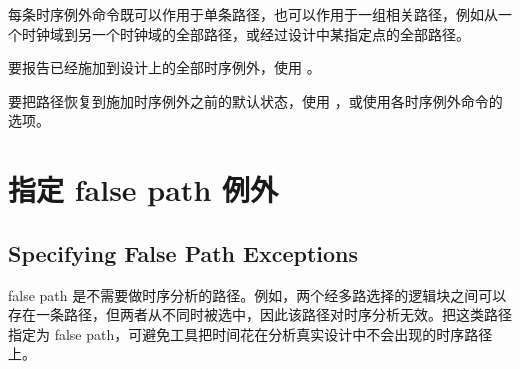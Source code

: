 每条时序例外命令既可以作用于单条路径，也可以作用于一组相关路径，例如从一个时钟域到另一个时钟域的全部路径，或经过设计中某指定点的全部路径。

要报告已经施加到设计上的全部时序例外，使用 。

要把路径恢复到施加时序例外之前的默认状态，使用 ，或使用各时序例外命令的  选项。

\section{指定 false path 例外}
\subsection*{Specifying False Path Exceptions}

false path 是不需要做时序分析的路径。例如，两个经多路选择的逻辑块之间可以存在一条路径，但两者从不同时被选中，因此该路径对时序分析无效。把这类路径指定为 false path，可避免工具把时间花在分析真实设计中不会出现的时序路径上。

